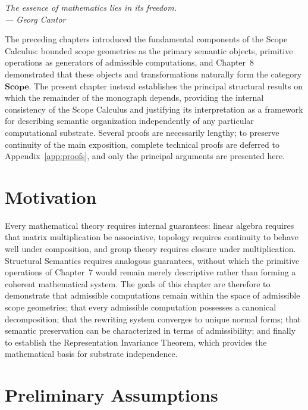 \documentclass[11pt,twoside,openright]{book}
\numberwithin{equation}{chapter}
\theoremstyle{definition}
\theoremstyle{plain}
\theoremstyle{remark}
\theoremstyle{definition}
\newcommand{\CatScope}{\mathbf{Scope}}
\begin{document}
\vspace{1em}
\begin{flushright}\itshape
The essence of mathematics lies in its freedom.\\
\upshape --- Georg Cantor
\end{flushright}
\vspace{1em}

The preceding chapters introduced the fundamental components of the Scope
Calculus: bounded scope geometries as the primary semantic objects,
primitive operations as generators of admissible computations, and
Chapter~8 demonstrated that these objects and transformations naturally
form the category $\CatScope$. The present chapter instead establishes the
principal structural results on which the remainder of the monograph
depends, providing the internal consistency of the Scope Calculus and
justifying its interpretation as a framework for describing semantic
organization independently of any particular computational substrate.
Several proofs are necessarily lengthy; to preserve continuity of the
main exposition, complete technical proofs are deferred to Appendix~\ref{app:proofs},
and only the principal arguments are presented here.

\section{Motivation}

Every mathematical theory requires internal guarantees: linear algebra
requires that matrix multiplication be associative, topology requires
continuity to behave well under composition, and group theory requires
closure under multiplication. Structural Semantics requires analogous
guarantees, without which the primitive operations of Chapter~7 would
remain merely descriptive rather than forming a coherent mathematical
system. The goals of this chapter are therefore to demonstrate that
admissible computations remain within the space of admissible scope
geometries; that every admissible computation possesses a canonical
decomposition; that the rewriting system converges to unique normal
forms; that semantic preservation can be characterized in terms of
admissibility; and finally to establish the Representation Invariance
Theorem, which provides the mathematical basis for substrate independence.

\section{Preliminary Assumptions}
\end{document}
